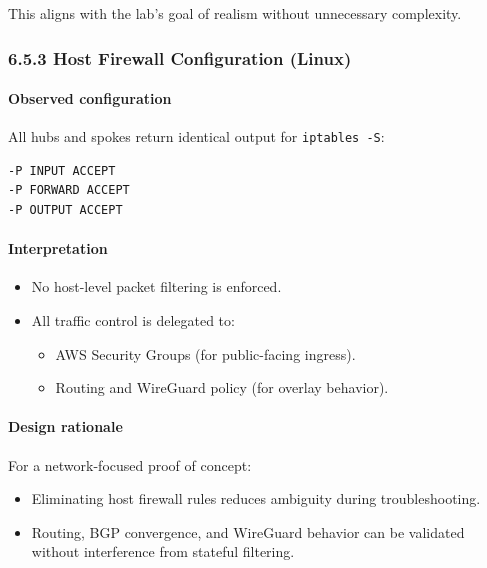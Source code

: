 \documentclass[11pt]{article}
\begin{document}
This aligns with the lab’s goal of realism without unnecessary complexity.

%
%
%
\subsubsection{6.5.3 Host Firewall Configuration (Linux)}

\paragraph{Observed configuration}
All hubs and spokes return identical output for \texttt{iptables -S}:

\begin{verbatim}
-P INPUT ACCEPT
-P FORWARD ACCEPT
-P OUTPUT ACCEPT
\end{verbatim}

\paragraph{Interpretation}
\begin{itemize}
  \item No host-level packet filtering is enforced.
  \item All traffic control is delegated to:
    \begin{itemize}
      \item AWS Security Groups (for public-facing ingress).
      \item Routing and WireGuard policy (for overlay behavior).
    \end{itemize}
\end{itemize}

\paragraph{Design rationale}
For a network-focused proof of concept:
\begin{itemize}
  \item Eliminating host firewall rules reduces ambiguity during troubleshooting.
  \item Routing, BGP convergence, and WireGuard behavior can be validated without interference from stateful filtering.
\end{itemize}
\end{document}
